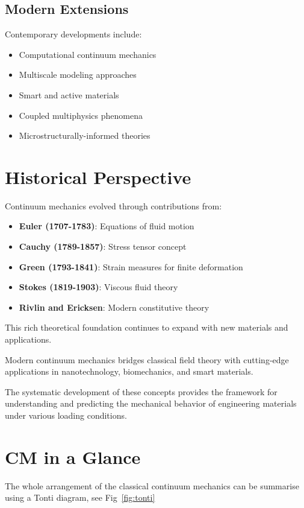 \subsection{Modern Extensions}

Contemporary developments include:
\begin{itemize}
\item Computational continuum mechanics
\item Multiscale modeling approaches
\item Smart and active materials
\item Coupled multiphysics phenomena
\item Microstructurally-informed theories
\end{itemize}

\section{Historical Perspective}

Continuum mechanics evolved through contributions from:
\begin{itemize}
\item \textbf{Euler (1707-1783)}: Equations of fluid motion
\item \textbf{Cauchy (1789-1857)}: Stress tensor concept
\item \textbf{Green (1793-1841)}: Strain measures for finite deformation
\item \textbf{Stokes (1819-1903)}: Viscous fluid theory
\item \textbf{Rivlin and Ericksen}: Modern constitutive theory
\end{itemize}

This rich theoretical foundation continues to expand with new materials and applications.

\begin{keypoint}
Modern continuum mechanics bridges classical field theory with cutting-edge applications in nanotechnology, biomechanics, and smart materials.
\end{keypoint}

The systematic development of these concepts provides the framework for understanding and predicting the mechanical behavior of engineering materials under various loading conditions.

\section{CM in a Glance}
The whole arrangement of the classical continuum mechanics can be summarise using a Tonti diagram, see Fig~\ref{fig:tonti}



